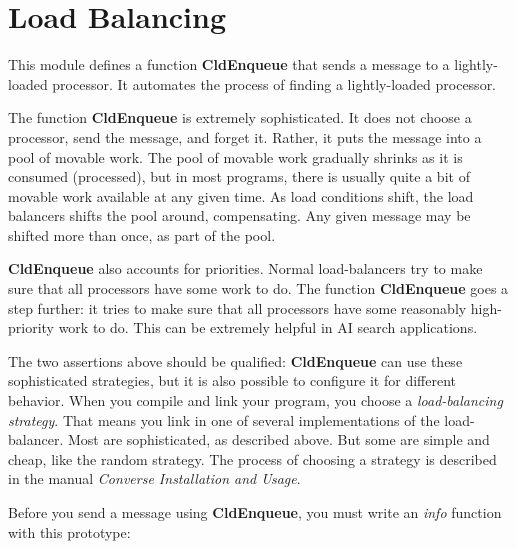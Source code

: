 \chapter{Load Balancing}

This module defines a function {\bf CldEnqueue} that sends a message
to a lightly-loaded processor.  It automates the process of finding a
lightly-loaded processor.  

The function {\bf CldEnqueue} is extremely sophisticated.  It does not
choose a processor, send the message, and forget it.  Rather, it puts
the message into a pool of movable work.  The pool of movable work
gradually shrinks as it is consumed (processed), but in most programs,
there is usually quite a bit of movable work available at any given
time.  As load conditions shift, the load balancers shifts the pool
around, compensating.  Any given message may be shifted more than
once, as part of the pool.

{\bf CldEnqueue} also accounts for priorities.  Normal load-balancers
try to make sure that all processors have some work to do.  The
function {\bf CldEnqueue} goes a step further: it tries to make sure
that all processors have some reasonably high-priority work to do.
This can be extremely helpful in AI search applications.

The two assertions above should be qualified: {\bf CldEnqueue} can use
these sophisticated strategies, but it is also possible to configure
it for different behavior.  When you compile and link your program, you
choose a {\sl load-balancing strategy}.  That means you link in one of
several implementations of the load-balancer.  Most are sophisticated,
as described above.  But some are simple and cheap, like the random
strategy.  The process of choosing a strategy is described in the
manual {\em Converse Installation and Usage}.


Before you send a message using {\bf CldEnqueue}, you must write an
{\sl info} function with this prototype:

